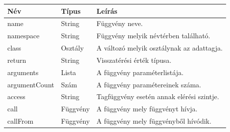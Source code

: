 \documentclass[a4paper,12pt]{report}
\begin{document}
\begin{center}
	\begin{tabular}{| l | l | l |}
		\hline
		Név & Típus & Leírás \\ \hline
		name & String & Függvény neve. \\ \hline
		namespace & String & Függvény melyik névtérben található. \\ \hline
		class & Osztály & A változó melyik osztálynak az adattagja. \\ \hline
		return & String & Visszatérési érték típusa. \\ \hline
		arguments & Lista & A függvény paraméterlistája. \\ \hline
		argumentCount & Szám & A függvény paramétereinek száma. \\ \hline
		access & String & Tagfüggvény esetén annak elérési szintje. \\ \hline
		call & Függvény & A függvény mely függvényt hívja. \\ \hline
		callFrom & Függvény & A függvény mely függvényből hívódik. \\ \hline
	\end{tabular}
\end{center}
\end{document}
